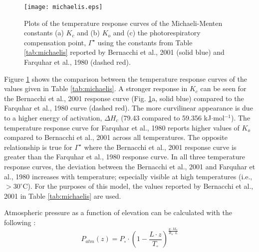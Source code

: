 \begin{figure}[h!]
	\centering
    \texttt{[image: michaelis.eps]}
    \caption{Plots of the temperature response curves of the Michaeli-Menten 
    constants (a) $K_c$ and (b) $K_o$ and (c) the photorespiratory compensation 
    point, $\Gamma^{\star}$ using the constants from Table \ref{tab:michaelis}
    reported by Bernacchi et al., 2001 (solid blue) and Farquhar et al., 1980 
    (dashed red).}
    \label{fig:michaelis}
\end{figure}

\noindent Figure \ref{fig:michaelis} shows the comparison between the temperature response curves of the values given in Table \ref{tab:michaelis}.  
A stronger response in $K_c$ can be seen for the Bernacchi et al., 2001 response curve (Fig. \ref{fig:michaelis}a, solid blue) compared to the Farquhar et al., 1980 curve (dashed red).  
The more curvilinear appearance is due to a higher energy of activation, $\Delta H_c$ (79.43 compared to 59.356 kJ$\cdot$mol$^{-1}$). 
The temperature response curve for Farquhar et al., 1980 reports higher values of $K_o$ compared to Bernacchi et al., 2001 across all temperatures.  
The opposite relationship is true for $\Gamma^{\star}$ where the Bernacchi et al., 2001 response curve is greater than the Farquhar et al., 1980 response curve.  
In all three  temperature response curves, the deviation between the Bernacchi et al., 2001 and Farquhar et al., 1980 increases with temperature; especially visible at high temperatures (i.e., $>30^{\circ}$C). 
For the purposes of this model, the values reported by Bernacchi et al., 2001 in Table \ref{tab:michaelis} are used.  

%
%
Atmospheric pressure as a function of elevation can be calculated with the following \parencite{cavcar00}:
%
%
%
%
%
%
\begin{equation}
\label{eq:pz}
    P_{atm}\left( z \right) = P_{\circ} \cdot \left( 
    	1 - \frac{L \cdot z}{T_{\circ}} 
    \right)^{\frac{g \cdot M_a}{R_u \cdot L}}
\end{equation}

